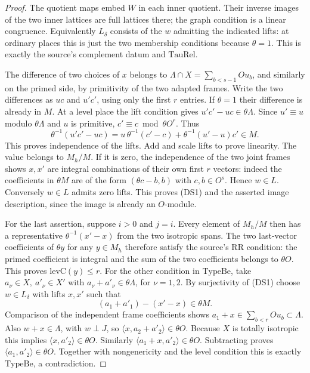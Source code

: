 \begin{proof}
The quotient maps embed \(W\) in each inner quotient. Their
inverse images of the two inner lattices are full lattices there;
the graph condition is a linear congruence. Equivalently
\(L_\delta\) consists of the \(w\) admitting the indicated lifts:
at ordinary places this is just the two membership conditions
because \(\theta=1\). This is exactly the source's complement
datum and \(\mathrm{TauRel}\).

The difference of two choices of \(x\) belongs to
\(\Lambda\cap X=\sum_{b<s-1}Ou_b\), and similarly on the
primed side, by primitivity of the two adapted frames.
Write the two differences as \(u c\) and \(u' c'\), using
only the first \(r\) entries. If \(\theta=1\) their difference
is already in \(M\). At a level place the lift condition
gives \(u'c'-uc\in\theta\Lambda\). Since \(u'\equiv u\)
modulo \(\theta\Lambda\) and \(u\) is primitive,
\(c'\equiv c\bmod\theta O^r\). Thus
\[
 \theta^{-1}(u'c'-uc)=u\,\theta^{-1}(c'-c)
                          +\theta^{-1}(u'-u)c'\in M .
\]
This proves independence of the lifts. Add and scale lifts to
prove linearity. The value belongs to \(M_h/M\).
If it is zero, the independence of the two joint frames
shows \(x,x'\) are integral combinations of their own
first \(r\) vectors: indeed the coefficients in
\(\theta M\) are of the form \((\theta c-b,b)\)
with \(c,b\in O^s\). Hence \(w\in L\).
Conversely \(w\in L\) admits zero lifts. This proves (DS1)
and the asserted image description, since the image is
already an \(O\)-module.

For the last assertion, suppose \(i>0\) and \(j=i\).
Every element of \(M_h/M\) then has a representative
\(\theta^{-1}(x'-x)\) from the two isotropic spans.
The two last-vector coefficients of \(\theta y\) for
any \(y\in M_h\) therefore satisfy the source's
\(\mathrm{RR}\) condition: the primed coefficient
is integral and the sum of the two coefficients belongs
to \(\theta O\). This proves \(\mathrm{levC}(y)\le r\).
For the other condition in \(\mathrm{TypeBe}\), take
\(a_\nu\in X,\ a'_\nu\in X'\) with
\(a_\nu+a'_\nu\in\theta\Lambda\), for \(\nu=1,2\).
By surjectivity of (DS1) choose \(w\in L_\delta\) with
lifts \(x,x'\) such that
\[
 (a_1+a'_1)-(x'-x)\in\theta M .
\]
Comparison of the independent frame coefficients shows
\(a_1+x\in\sum_{b<r}Ou_b\subset\Lambda\).
Also \(w+x\in\Lambda\), with \(w\perp J\), so
\(\langle x,a_2+a'_2\rangle\in\theta O\).
Because \(X\) is totally isotropic this implies
\(\langle x,a'_2\rangle\in\theta O\).
Similarly \(\langle a_1+x,a'_2\rangle\in\theta O\).
Subtracting proves \(\langle a_1,a'_2\rangle\in\theta O\).
Together with nongenericity and the level condition this is
exactly \(\mathrm{TypeBe}\), a contradiction.
\end{proof}

